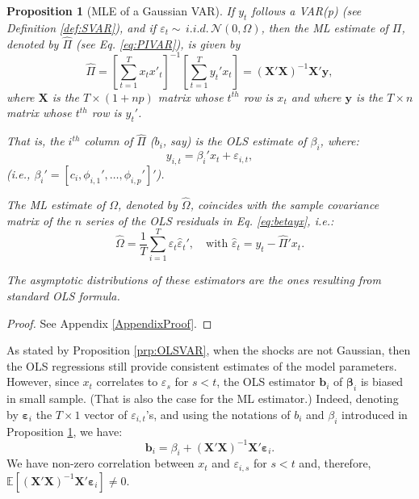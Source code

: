\documentclass[
  11pt,
]{book}
\newtheorem{proposition}{Proposition}[chapter]
\theoremstyle{definition}
\theoremstyle{definition}
\theoremstyle{definition}
\theoremstyle{definition}
\theoremstyle{remark}
\begin{document}
\begin{proposition}[MLE of a Gaussian VAR]
\protect\hypertarget{prp:estimVARGaussian}{}\label{prp:estimVARGaussian}If \(y_t\) follows a VAR(p) (see Definition \ref{def:SVAR}), and if \(\varepsilon_t \sim \,i.i.d.\,\mathcal{N}(0,\Omega)\), then the ML estimate of \(\Pi\), denoted by \(\hat{\Pi}\) (see Eq. \eqref{eq:PIVAR}), is given by
\begin{equation}
\hat{\Pi}=\left[\sum_{t=1}^{T}x_{t}x'_{t}\right]^{-1}\left[\sum_{t=1}^{T}y_{t}'x_{t}\right]= (\mathbf{X}'\mathbf{X})^{-1}\mathbf{X}'\mathbf{y},\label{eq:Pi}
\end{equation}
where \(\mathbf{X}\) is the \(T \times (1+np)\) matrix whose \(t^{th}\) row is \(x_t\) and where \(\mathbf{y}\) is the \(T \times n\) matrix whose \(t^{th}\) row is \(y_{t}'\).

That is, the \(i^{th}\) column of \(\hat{\Pi}\) (\(b_i\), say) is the OLS estimate of \(\beta_i\), where:
\begin{equation}
y_{i,t} = \beta_i'x_t + \varepsilon_{i,t},\label{eq:betayx}
\end{equation}
(i.e., \(\beta_i' = [c_i,\phi_{i,1}',\dots,\phi_{i,p}']'\)).

The ML estimate of \(\Omega\), denoted by \(\hat{\Omega}\), coincides with the sample covariance matrix of the \(n\) series of the OLS residuals in Eq. \eqref{eq:betayx}, i.e.:
\begin{equation}
\hat{\Omega} = \frac{1}{T} \sum_{i=1}^T \hat{\varepsilon}_t\hat{\varepsilon}_t',\quad\mbox{with } \hat{\varepsilon}_t= y_t - \hat{\Pi}'x_t.
\end{equation}

The asymptotic distributions of these estimators are the ones resulting from standard OLS formula.
\end{proposition}

\begin{proof}
See Appendix \ref{AppendixProof}.
\end{proof}

As stated by Proposition \ref{prp:OLSVAR}, when the shocks are not Gaussian, then the OLS regressions still provide consistent estimates of the model parameters. However, since \(x_t\) correlates to \(\varepsilon_s\) for \(s<t\), the OLS estimator \(\mathbf{b}_i\) of \(\boldsymbol\beta_i\) is biased in small sample. (That is also the case for the ML estimator.) Indeed, denoting by \(\boldsymbol\varepsilon_i\) the \(T \times 1\) vector of \(\varepsilon_{i,t}\)'s, and using the notations of \(b_i\) and \(\beta_i\) introduced in Proposition \ref{prp:estimVARGaussian}, we have:
\begin{equation}
\mathbf{b}_i = \beta_i + (\mathbf{X}'\mathbf{X})^{-1}\mathbf{X}'\boldsymbol\varepsilon_i.\label{eq:olsvar1}
\end{equation}
We have non-zero correlation between \(x_t\) and \(\varepsilon_{i,s}\) for \(s<t\) and, therefore, \(\mathbb{E}[(\mathbf{X}'\mathbf{X})^{-1}\mathbf{X}'\boldsymbol\varepsilon_i] \ne 0\).
\end{document}
